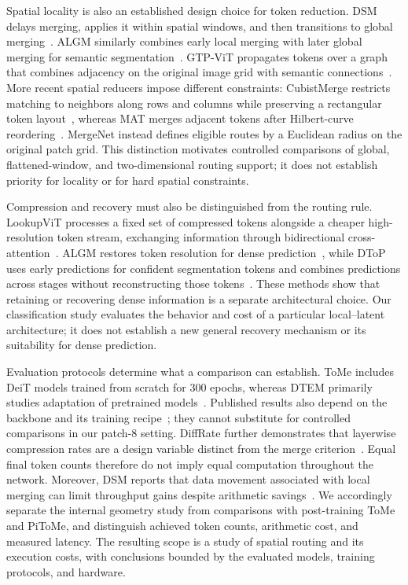 Spatial locality is also an established design choice for token reduction.
DSM delays merging, applies it within spatial windows, and then transitions
to global merging~\cite{dsm2024}. ALGM similarly combines early local merging
with later global merging for semantic segmentation~\cite{algm2024}.
GTP-ViT propagates tokens over a graph that combines adjacency on the original
image grid with semantic connections~\cite{gtpvit2024}. More recent spatial
reducers impose different constraints: CubistMerge restricts matching to
neighbors along rows and columns while preserving a rectangular token
layout~\cite{cubistmerge2026}, whereas MAT merges adjacent tokens after
Hilbert-curve reordering~\cite{napmat2025}. MergeNet instead defines eligible
routes by a Euclidean radius on the original patch grid. This distinction
motivates controlled comparisons of global, flattened-window, and
two-dimensional routing support; it does not establish priority for locality
or for hard spatial constraints.

Compression and recovery must also be distinguished from the routing rule.
LookupViT processes a fixed set of compressed tokens alongside a cheaper
high-resolution token stream, exchanging information through bidirectional
cross-attention~\cite{lookupvit2024}. ALGM restores token resolution for dense
prediction~\cite{algm2024}, while DToP uses early predictions for confident
segmentation tokens and combines predictions across stages without
reconstructing those tokens~\cite{dtop2023}. These methods show that retaining
or recovering dense information is a separate architectural choice. Our
classification study evaluates the behavior and cost of a particular
local--latent architecture; it does not establish a new general recovery
mechanism or its suitability for dense prediction.

Evaluation protocols determine what a comparison can establish. ToMe includes
DeiT models trained from scratch for 300 epochs, whereas DTEM primarily
studies adaptation of pretrained models~\cite{tome2023,dtem2024}. Published
results also depend on the backbone and its training
recipe~\cite{deit2021}; they cannot substitute for controlled comparisons in
our patch-8 setting. DiffRate further demonstrates that layerwise compression
rates are a design variable distinct from the merge
criterion~\cite{diffrate2023}. Equal final token counts therefore do not imply
equal computation throughout the network. Moreover, DSM reports that data
movement associated with local merging can limit throughput gains despite
arithmetic savings~\cite{dsm2024}. We accordingly separate the internal
geometry study from comparisons with post-training ToMe and PiToMe, and
distinguish achieved token counts, arithmetic cost, and measured latency.
The resulting scope is a study of spatial routing and its execution costs,
with conclusions bounded by the evaluated models, training protocols, and
hardware.
